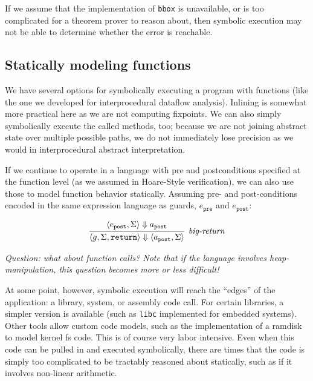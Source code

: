 \documentclass[11pt]{article}
\begin{document}
If we assume that the implementation of \texttt{bbox} is unavailable, or is too
complicated for a theorem prover to reason about, then symbolic execution may
not be able to determine whether the error is reachable.


\subsection{Statically modeling functions}

We have several options for symbolically executing a program with functions
(like the one we developed for interprocedural dataflow analysis).  Inlining is
somewhat more practical here as we are not computing fixpoints.  We can also
simply symbolically execute the called methods, too;  because we are not joining
abstract state over multiple possible paths, we do not immediately lose
precision as we would in interprocedural abstract interpretation.

If we continue to operate in a language with pre and postconditions specified at
the function level (as we assumed in Hoare-Style verification), we can also use
those to model function behavior statically.  Assuming pre- and post-conditions encoded
in the same expression language as guards, $e_{\mathtt{pre}}$ and
$e_{\mathtt{post}}$:

\[
\begin{array}{c}
\infer[\textit{big-return}]{\langle g,\Sigma, \mathtt{return} \rangle \Downarrow \langle a_{\mathtt{post}} ,\Sigma \rangle} {\langle e_{\mathtt{post}},\Sigma \rangle \Downarrow a_{\mathtt{post}}} \\
\end{array}
\]

\noindent \emph{Question: what about function calls? Note that if the language
  involves heap-manipulation, this question becomes more or less difficult!}  

At some point, however, symbolic execution will reach the ``edges'' of the
application: a library, system, or assembly code call. For certain libraries, a
simpler version is available (such as \texttt{libc} implemented for embedded
systems). Other tools allow custom code models, such as the implementation of a
ramdisk to model kernel fs code. This is of course very labor intensive. Even
when this code can be pulled in and executed symbolically, there are times that
the code is simply too complicated to be tractably reasoned about statically,
such as if it involves non-linear arithmetic.
\end{document}
